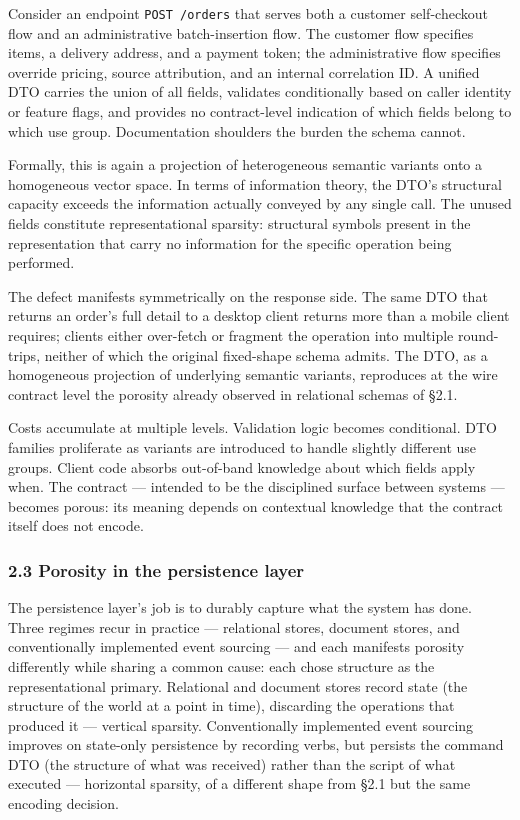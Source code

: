 \documentclass[
]{article}
\let\origtexttt\texttt%
\renewcommand{\texttt}[1]{\origtexttt{\seqsplit{#1}}}%
\let\texttt\origtexttt%
\begin{document}
Consider an endpoint \texttt{POST\ /orders} that serves both a customer
self-checkout flow and an administrative batch-insertion flow. The
customer flow specifies items, a delivery address, and a payment token;
the administrative flow specifies override pricing, source attribution,
and an internal correlation ID. A unified DTO carries the union of all
fields, validates conditionally based on caller identity or feature
flags, and provides no contract-level indication of which fields belong
to which use group. Documentation shoulders the burden the schema
cannot.

Formally, this is again a projection of heterogeneous semantic variants
onto a homogeneous vector space. In terms of information theory, the
DTO's structural capacity exceeds the information actually conveyed by
any single call. The unused fields constitute representational sparsity:
structural symbols present in the representation that carry no
information for the specific operation being performed.

The defect manifests symmetrically on the response side. The same DTO
that returns an order's full detail to a desktop client returns more
than a mobile client requires; clients either over-fetch or fragment the
operation into multiple round-trips, neither of which the original
fixed-shape schema admits. The DTO, as a homogeneous projection of
underlying semantic variants, reproduces at the wire contract level the
porosity already observed in relational schemas of §2.1.

Costs accumulate at multiple levels. Validation logic becomes
conditional. DTO families proliferate as variants are introduced to
handle slightly different use groups. Client code absorbs out-of-band
knowledge about which fields apply when. The contract --- intended to be
the disciplined surface between systems --- becomes porous: its meaning
depends on contextual knowledge that the contract itself does not
encode.

\subsubsection{2.3 Porosity in the persistence
layer}\label{porosity-in-the-persistence-layer}

The persistence layer's job is to durably capture what the system has
done. Three regimes recur in practice --- relational stores, document
stores, and conventionally implemented event sourcing --- and each
manifests porosity differently while sharing a common cause: each chose
structure as the representational primary. Relational and document
stores record state (the structure of the world at a point in time),
discarding the operations that produced it --- vertical sparsity.
Conventionally implemented event sourcing improves on state-only
persistence by recording verbs, but persists the command DTO (the
structure of what was received) rather than the script of what executed
--- horizontal sparsity, of a different shape from §2.1 but the same
encoding decision.
\end{document}
